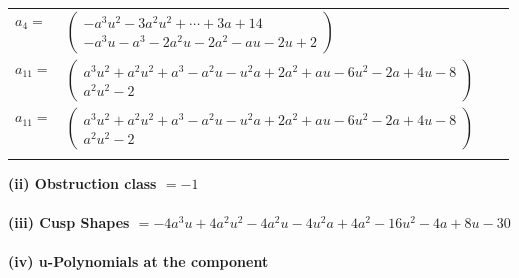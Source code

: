 \documentclass[1p]{elsarticle_modified}
\theoremstyle{definition}
\begin{document}
\begin{tabular}{m{7pt} m{180pt} m{7pt} m{180pt} }
\flushright $a_{4}=$&$\begin{pmatrix}- a^3 u^2-3 a^2 u^2+\cdots+3 a+14\\- a^3 u- a^3-2 a^2 u-2 a^2- a u-2 u+2\end{pmatrix}$ \\
\flushright $a_{11}=$&$\begin{pmatrix}a^3 u^2+a^2 u^2+a^3- a^2 u- u^2 a+2 a^2+a u-6 u^2-2 a+4 u-8\\a^2 u^2-2\end{pmatrix}$\\ \flushright $a_{11}=$&$\begin{pmatrix}a^3 u^2+a^2 u^2+a^3- a^2 u- u^2 a+2 a^2+a u-6 u^2-2 a+4 u-8\\a^2 u^2-2\end{pmatrix}$\\&\end{tabular}
\flushleft \textbf{(ii) Obstruction class $= -1$}\\~\\
\flushleft \textbf{(iii) Cusp Shapes $= -4 a^3 u+4 a^2 u^2-4 a^2 u-4 u^2 a+4 a^2-16 u^2-4 a+8 u-30$}\\~\\
\newpage\renewcommand{\arraystretch}{1}
\flushleft \textbf{(iv) u-Polynomials at the component}\newline \\
\end{document}
